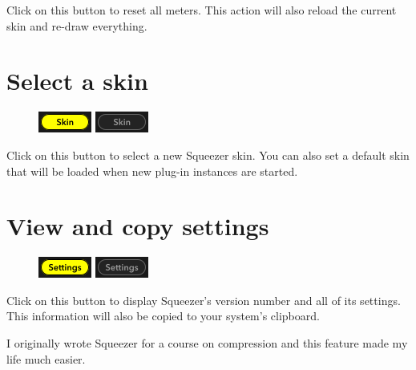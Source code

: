 Click on this button to reset all meters.  This action will also
reload the current skin and re-draw everything.

\section{Select a skin}

\begin{figure}
  \includegraphics[scale=\screenshotscale,clip]{include/images/button_skin_on.png}
  \newline \vspace{-0.9\baselineskip}
  \includegraphics[scale=\screenshotscale,clip]{include/images/button_skin_off.png}
\end{figure}

Click on this button to select a new Squeezer skin.  You can also set
a default skin that will be loaded when new plug-in instances are
started.

\section{View and copy settings}

\begin{figure}
  \includegraphics[scale=\screenshotscale,clip]{include/images/button_settings_on.png}
  \newline \vspace{-0.9\baselineskip}
  \includegraphics[scale=\screenshotscale,clip]{include/images/button_settings_off.png}
\end{figure}

Click on this button to display Squeezer's version number and all of
its settings.  This information will also be copied to your system's
clipboard.

I originally wrote Squeezer for a course on compression and this
feature made my life much easier.

